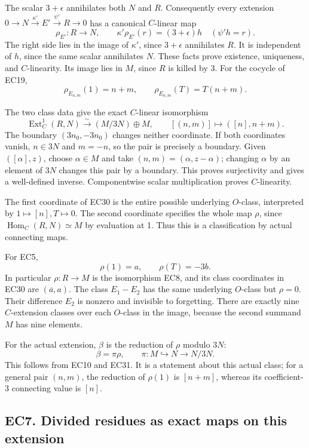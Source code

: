 \documentclass[
  10pt,
  a4paper,
]{article}
\begin{document}
The scalar \(3+\epsilon\) annihilates both \(N\) and \(R\). Consequently
every extension
\(0\to N\xrightarrow{\kappa'}E'\xrightarrow{\psi'}R\to0\) has a
canonical \(C\)-linear map \[
\rho_{E'}:R\longrightarrow N,\qquad
\kappa'\rho_{E'}(r)=(3+\epsilon)h
\quad(\psi'h=r).
\tag{EC28}
\] The right side lies in the image of \(\kappa'\), since \(3+\epsilon\)
annihilates \(R\). It is independent of \(h\), since the same scalar
annihilates \(N\). These facts prove existence, uniqueness, and
\(C\)-linearity. Its image lies in \(M\), since \(R\) is killed by 3.
For the cocycle of EC19, \[
\rho_{E_{n,m}}(1)=n+m,\qquad
\rho_{E_{n,m}}(T)=T(n+m).
\tag{EC29}
\]

The two class data give the exact \(C\)-linear isomorphism \[
\boxed{
\operatorname{Ext}^1_C(R,N)
\xrightarrow{\sim}(M/3N)\oplus M,\qquad
[(n,m)]\longmapsto([n],n+m).}
\tag{EC30}
\] The boundary \((3n_0,-3n_0)\) changes neither coordinate. If both
coordinates vanish, \(n\in3N\) and \(m=-n\), so the pair is precisely a
boundary. Given \(([\alpha],z)\), choose \(\alpha\in M\) and take
\((n,m)=(\alpha,z-\alpha)\); changing \(\alpha\) by an element of \(3N\)
changes this pair by a boundary. This proves surjectivity and gives a
well-defined inverse. Componentwise scalar multiplication proves
\(C\)-linearity.

The first coordinate of EC30 is the entire possible underlying
\(O\)-class, interpreted by \(1\mapsto[n],T\mapsto0\). The second
coordinate specifies the whole map \(\rho\), since
\(\operatorname{Hom}_C(R,N)\simeq M\) by evaluation at 1. Thus this is a
classification by actual connecting maps.

For EC5, \[
\rho(1)=a,\qquad \rho(T)=-3b.
\tag{EC31}
\] In particular \(\rho:R\to M\) is the isomorphism EC8, and its class
coordinates in EC30 are \((\overline a,a)\). The class \(E_1-E_2\) has
the same underlying \(O\)-class but \(\rho=0\). Their difference \(E_2\)
is nonzero and invisible to forgetting. There are exactly nine
\(C\)-extension classes over each \(O\)-class in the image, because the
second summand \(M\) has nine elements.

For the actual extension, \(\beta\) is the reduction of \(\rho\) modulo
\(3N\): \[
\beta=\pi\rho,\qquad \pi:M\hookrightarrow N\to N/3N.
\tag{EC32}
\] This follows from EC10 and EC31. It is a statement about this actual
class; for a general pair \((n,m)\), the reduction of \(\rho(1)\) is
\([n+m]\), whereas its coefficient-3 connecting value is \([n]\).

\subsection{EC7. Divided residues as exact maps on this
extension}\label{ec7.-divided-residues-as-exact-maps-on-this-extension}
\end{document}
